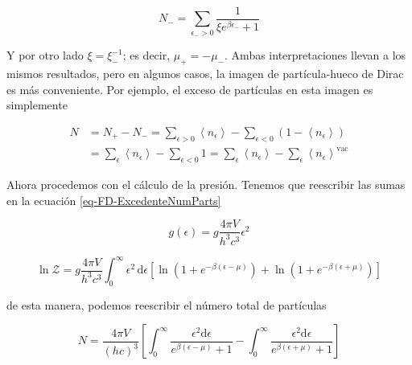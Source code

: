 \begin{equation}
{N}_{-} = \sum_{{\epsilon}_{-}>0} \frac{1}{{\xi}{e}^{\beta{\epsilon}_{-}}+1}
\end{equation}

Y por otro lado ${\xi} = {\xi}_{-}^{-1}$; es decir, ${\mu}_{+} = - {\mu}_{-}$. Ambas interpretaciones llevan a los mismos resultados, pero en algunos casos, la imagen de partícula-hueco de Dirac es más conveniente. Por ejemplo, el exceso de partículas en esta imagen es simplemente

\begin{equation}
\begin{split}
N & = {N}_{+} - {N}_{-} = \sum_{\epsilon > 0} \left\langle {n}_{\epsilon} \right\rangle - \sum_{\epsilon < 0} \left(1 - \left\langle {n}_{\epsilon} \right\rangle \right) \\
& = \sum_{\epsilon} \left\langle {n}_{\epsilon} \right\rangle  - \sum _{\epsilon < 0} 1 = \sum_{\epsilon} \left\langle {n}_{\epsilon} \right\rangle  - \sum_{\epsilon} \left\langle {n}_{\epsilon} \right\rangle ^{\mathrm{vac}}
\end{split}
\end{equation}




Ahora procedemos con el cálculo de la presión. Tenemos que reescribir las sumas en la ecuación \eqref{eq-FD-ExcedenteNumParts}

\begin{equation}
{g}(\epsilon) = g \frac{4\pi V}{{h}^{3}{c}^{3}} {\epsilon}^{2}
\end{equation}

\begin{equation}
\ln \mathcal{Z} = g \frac{4 \pi V}{{h}^{3}{c}^{3}} \int_{0}^{\infty} {\epsilon}^{2} \, \mathrm{d} \epsilon \left[\ln \left( 1 + {e}^{-\beta \left(\epsilon - \mu \right)} \right) + \ln \left(1 + {e}^{-\beta \left(\epsilon + \mu\right)} \right) \right]
\end{equation}

de esta manera, podemos reescribir el número total de partículas 

\begin{equation}
N =\frac{4 \pi V}{(hc)^{3}} \left[ \int_{0}^{\infty} \frac{{\epsilon}^{2} \mathrm{d} \epsilon}{{e}^{\beta (\epsilon-\mu)} + 1} - \int_{0}^{\infty} \frac{{\epsilon}^{2} \mathrm{d} \epsilon}{{e}^{\beta (\epsilon+\mu)} + 1} \right] 
\end{equation}

